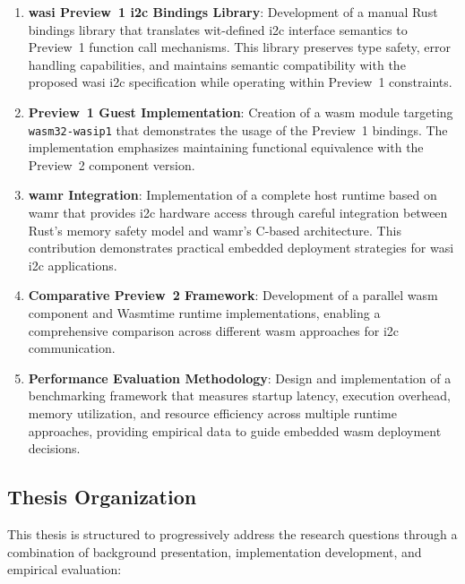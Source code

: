 \begin{enumerate}
    \item \textbf{\acrshort{wasi} Preview~1 \acrshort{i2c} Bindings Library}: Development of a manual Rust bindings library that translates \acrshort{wit}-defined \acrshort{i2c} interface semantics to Preview~1 function call mechanisms. This library preserves type safety, error handling capabilities, and maintains semantic compatibility with the proposed \acrshort{wasi} \acrshort{i2c} specification while operating within Preview~1 constraints.

    \item \textbf{Preview~1 Guest Implementation}: Creation of a \acrshort{wasm} module targeting \sloppy\texttt{wasm32-wasip1} that demonstrates the usage of the Preview~1 bindings. The implementation emphasizes maintaining functional equivalence with the Preview~2 component version.

    \item \textbf{\acrshort{wamr} Integration}: Implementation of a complete host runtime based on \acrshort{wamr} that provides \acrshort{i2c} hardware access through careful integration between Rust's memory safety model and \acrshort{wamr}'s C-based architecture. This contribution demonstrates practical embedded deployment strategies for \acrshort{wasi} \acrshort{i2c} applications.

    \item \textbf{Comparative Preview~2 Framework}: Development of a parallel \acrshort{wasm} component and Wasmtime runtime implementations, enabling a comprehensive comparison across different \acrshort{wasm} approaches for \acrshort{i2c} communication.

    \item \textbf{Performance Evaluation Methodology}: Design and implementation of a benchmarking framework that measures startup latency, execution overhead, memory utilization, and resource efficiency across multiple runtime approaches, providing empirical data to guide embedded \acrshort{wasm} deployment decisions.
\end{enumerate}

\subsection{Thesis Organization}
\label{subsec:thesis-organization}

This thesis is structured to progressively address the research questions through a combination of background presentation, implementation development, and empirical evaluation:

